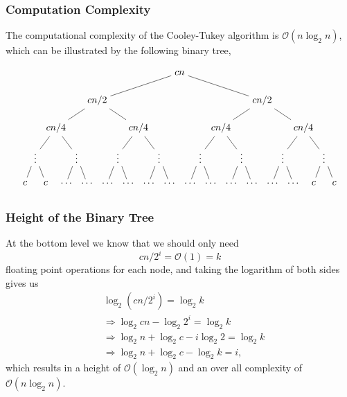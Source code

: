 \documentclass{beamer}
\begin{document}
\begin{frame}
	\frametitle{Computation Complexity}
	The computational complexity of the Cooley-Tukey algorithm is $\mathcal{O}(n\log_2{n})$, which can be
	illustrated by the following binary tree,
	\begin{centering}
	\[
	\begin{tikzpicture}[level distance=1.00cm,
	  level 1/.style={sibling distance=6cm},
	  level 2/.style={sibling distance=3cm},
	  level 3/.style={sibling distance=1.5cm},
	  level 4/.style={sibling distance=0.75cm}]

	  \node {$cn$}
	    child {node {$cn/2$}
	      child {node {$cn/4$}
		child {node {$\vdots$}
		  child {node {$c$}}
		  child {node {$c$}}
		}
		child {node {$\vdots$}
		  child {node {$\ldots$}}
		  child {node {$\ldots$}}
		}
	      }
	      child {node {$cn/4$}
		child {node {$\vdots$}
		  child {node {$\ldots$}}
		  child {node {$\ldots$}}
		}
		child {node {$\vdots$}
		  child {node {$\ldots$}}
		  child {node {$\ldots$}}
		}
	      }
	    }
	    child {node {$cn/2$}
	      child {node {$cn/4$}
		child {node {$\vdots$}
		  child {node {$\ldots$}}
		  child {node {$\ldots$}}
		}
		child {node {$\vdots$}
		  child {node {$\ldots$}}
		  child {node {$\ldots$}}
		}
	      }
	      child {node {$cn/4$}
		child {node {$\vdots$}
		  child {node {$\ldots$}}
		  child {node {$\ldots$}}
		}
		child {node {$\vdots$}
		  child {node {$c$}}
		  child {node {$c$}}
		}
	      }
	    };
	\end{tikzpicture}
	\]
	\end{centering}
\end{frame}
\begin{frame}
	\frametitle{Height of the Binary Tree}
	At the bottom level we know that we should only need 
	\begin{equation*}
		cn/2^i = \mathcal{O}(1) = k
	\end{equation*}
	floating point operations for each node, and taking the logarithm of both sides gives us
	\begin{equation*}
		\begin{aligned}
			&\log_2{(cn/2^i)} = \log_2{k} \\
			&\Rightarrow\log_2{cn} - \log_2{2^i} = \log_2{k} \\
			&\Rightarrow\log_2{n} + \log_2{c} - i\log_2{2} = \log_2{k} \\
			&\Rightarrow\log_2{n} + \log_2{c} - \log_2{k} = i,
		\end{aligned}
	\end{equation*}
	which results in a height of $\mathcal{O}(\log_2{n})$ and an over all complexity of
	$\mathcal{O}(n\log_2{n})$.
\end{frame}
\end{document}
